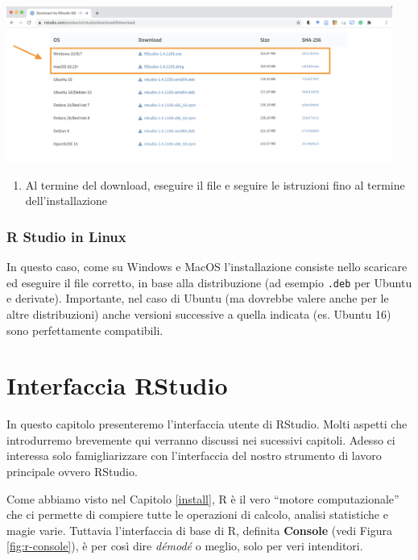 \documentclass[
]{book}
\providecommand{\tightlist}{%
  \setlength{\itemsep}{0pt}\setlength{\parskip}{0pt}}
\begin{document}
\includegraphics[width=0.95\textwidth,height=\textheight]{images/install_rstudio3.png}

\begin{enumerate}
\def\labelenumi{\arabic{enumi}.}
\setcounter{enumi}{4}
\tightlist
\item
  Al termine del download, eseguire il file e seguire le istruzioni fino al termine dell'installazione
\end{enumerate}

\hypertarget{r-studio-in-linux}{%
\subsection{R Studio in Linux}\label{r-studio-in-linux}}

In questo caso, come su Windows e MacOS l'installazione consiste nello scaricare ed eseguire il file corretto, in base alla distribuzione (ad esempio \texttt{.deb} per Ubuntu e derivate). Importante, nel caso di Ubuntu (ma dovrebbe valere anche per le altre distribuzioni) anche versioni successive a quella indicata (es. Ubuntu 16) sono perfettamente compatibili.

\hypertarget{rstudio-gui}{%
\chapter{Interfaccia RStudio}\label{rstudio-gui}}

In questo capitolo presenteremo l'interfaccia utente di RStudio. Molti aspetti che introdurremo brevemente qui verranno discussi nei sucessivi capitoli. Adesso ci interessa solo famigliarizzare con l'interfaccia del nostro strumento di lavoro principale ovvero RStudio.

Come abbiamo visto nel Capitolo \ref{install}, R è il vero ``motore computazionale'' che ci permette di compiere tutte le operazioni di calcolo, analisi statistiche e magie varie. Tuttavia l'interfaccia di base di R, definita \textbf{Console} (vedi Figura \ref{fig:r-console}), è per così dire \emph{démodé} o meglio, solo per veri intenditori.
\end{document}
